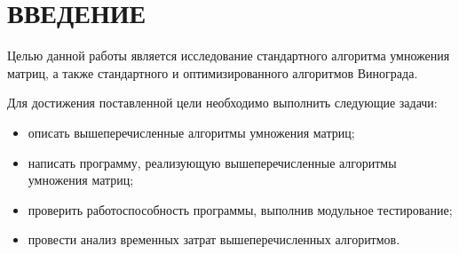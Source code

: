\chapter*{\hfill{\centering ВВЕДЕНИЕ}\hfill}

Целью данной работы является исследование стандартного алгоритма умножения матриц, а также стандартного и оптимизированного алгоритмов Винограда.

\label{sec:goals}
Для достижения поставленной цели необходимо выполнить следующие задачи:
\begin{itemize}[label=---]
	\item описать вышеперечисленные алгоритмы умножения матриц;
	\item написать программу, реализующую вышеперечисленные алгоритмы умножения матриц;
	\item проверить работоспособность программы, выполнив модульное тестирование;
	\item провести анализ временных затрат вышеперечисленных алгоритмов.
\end{itemize}




